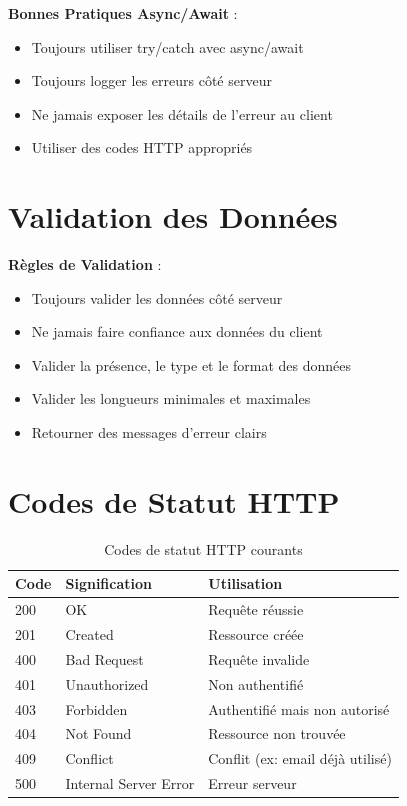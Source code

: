 \begin{bestpracticebox}
    \textbf{Bonnes Pratiques Async/Await} :
    \begin{itemize}
        \item Toujours utiliser try/catch avec async/await
        \item Toujours logger les erreurs côté serveur
        \item Ne jamais exposer les détails de l'erreur au client
        \item Utiliser des codes HTTP appropriés
    \end{itemize}
\end{bestpracticebox}

\section{Validation des Données}

\begin{bestpracticebox}
    \textbf{Règles de Validation} :
    \begin{itemize}
        \item Toujours valider les données côté serveur
        \item Ne jamais faire confiance aux données du client
        \item Valider la présence, le type et le format des données
        \item Valider les longueurs minimales et maximales
        \item Retourner des messages d'erreur clairs
    \end{itemize}
\end{bestpracticebox}

\section{Codes de Statut HTTP}

\begin{table}[h]
\centering
\begin{tabular}{|l|l|l|}
\hline
\textbf{Code} & \textbf{Signification} & \textbf{Utilisation} \\
\hline
200 & OK & Requête réussie \\
\hline
201 & Created & Ressource créée \\
\hline
400 & Bad Request & Requête invalide \\
\hline
401 & Unauthorized & Non authentifié \\
\hline
403 & Forbidden & Authentifié mais non autorisé \\
\hline
404 & Not Found & Ressource non trouvée \\
\hline
409 & Conflict & Conflit (ex: email déjà utilisé) \\
\hline
500 & Internal Server Error & Erreur serveur \\
\hline
\end{tabular}
\caption{Codes de statut HTTP courants}
\end{table}

